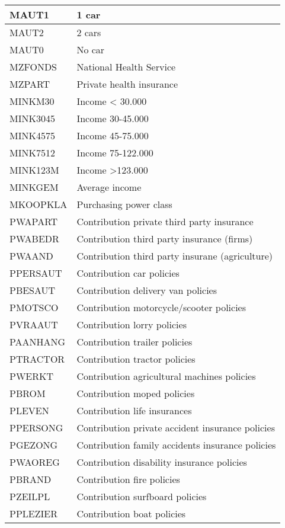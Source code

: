 \documentclass[man]{apa6}
\begin{document}
\begin{longtable}{l|l}
\hline
MAUT1 & 1 car\\
\hline
MAUT2 & 2 cars\\
\hline
MAUT0 & No car\\
\hline
MZFONDS & National Health Service\\
\hline
MZPART & Private health insurance\\
\hline
MINKM30 & Income < 30.000\\
\hline
MINK3045 & Income 30-45.000\\
\hline
MINK4575 & Income 45-75.000\\
\hline
MINK7512 & Income 75-122.000\\
\hline
MINK123M & Income >123.000\\
\hline
MINKGEM & Average income\\
\hline
MKOOPKLA & Purchasing power class\\
\hline
PWAPART & Contribution private third party insurance\\
\hline
PWABEDR & Contribution third party insurance (firms)\\
\hline
PWAAND & Contribution third party insurane (agriculture)\\
\hline
PPERSAUT & Contribution car policies\\
\hline
PBESAUT & Contribution delivery van policies\\
\hline
PMOTSCO & Contribution motorcycle/scooter policies\\
\hline
PVRAAUT & Contribution lorry policies\\
\hline
PAANHANG & Contribution trailer policies\\
\hline
PTRACTOR & Contribution tractor policies\\
\hline
PWERKT & Contribution agricultural machines policies\\
\hline
PBROM & Contribution moped policies\\
\hline
PLEVEN & Contribution life insurances\\
\hline
PPERSONG & Contribution private accident insurance policies\\
\hline
PGEZONG & Contribution family accidents insurance policies\\
\hline
PWAOREG & Contribution disability insurance policies\\
\hline
PBRAND & Contribution fire policies\\
\hline
PZEILPL & Contribution surfboard policies\\
\hline
PPLEZIER & Contribution boat policies\\

\end{longtable}
\end{document}
